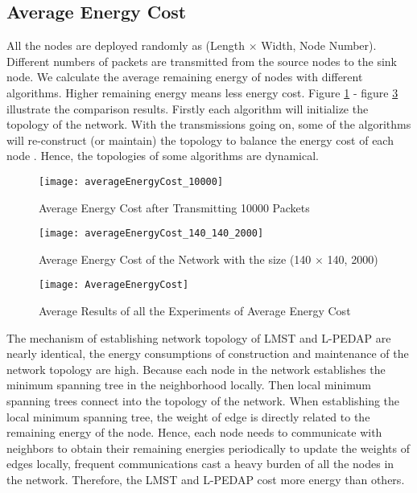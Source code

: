 \documentclass{elsarticle}
\begin{document}
\subsection{Average Energy Cost} \label{averageEnergyCost}
All the nodes are deployed randomly as (Length $\times$ Width, Node Number). Different numbers of packets are transmitted from the source nodes to the sink node. We calculate the average remaining energy of nodes with different algorithms. Higher remaining energy means less energy cost. Figure \ref{figure1} - figure \ref{figure3} illustrate the comparison results. Firstly each algorithm will initialize the topology of the network. With the transmissions going on, some of the algorithms will re-construct (or maintain) the topology to balance the energy cost of each node \cite{label-32}. Hence, the topologies of some algorithms are dynamical.

\begin{figure}
\centering
  \texttt{[image: averageEnergyCost\_10000]}
  \caption{Average Energy Cost after Transmitting 10000 Packets} \label{figure1}
\end{figure}

\begin{figure}
\centering
  \texttt{[image: averageEnergyCost\_140\_140\_2000]}
  \caption{Average Energy Cost of the Network with the size (140 $\times$ 140, 2000)} \label{figure2}
\end{figure}

\begin{figure}
\centering
  \texttt{[image: AverageEnergyCost]}
  \caption{Average Results of all the Experiments of Average Energy Cost} \label{figure3}
\end{figure}

The mechanism of establishing network topology of LMST and L-PEDAP are nearly identical, the energy consumptions of construction and maintenance of the network topology are high. Because each node in the network establishes the minimum spanning tree in the neighborhood locally. Then local minimum spanning trees connect into the topology of the network. When establishing the local minimum spanning tree, the weight of edge is directly related to the remaining energy of the node.  Hence, each node needs to communicate with neighbors to obtain their remaining energies periodically to update the weights of edges locally, frequent communications cast a heavy burden of all the nodes in the network. Therefore, the LMST and L-PEDAP cost more energy than others.
\end{document}

